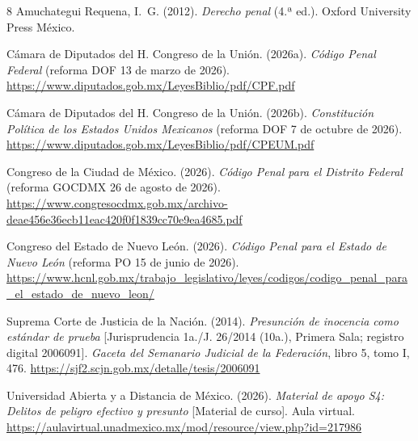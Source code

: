 \documentclass[spanish,letterpaper,oneside]{article}
\begin{document}
\begingroup\fontsize{10}{11.5}\selectfont
\setlength{\bibsep}{4pt}
\begin{thebibliography}{8}
Amuchategui Requena, I.~G. (2012). \emph{Derecho penal} (4.ª ed.). Oxford University Press México.

Cámara de Diputados del H. Congreso de la Unión. (2026a). \emph{Código Penal Federal} (reforma DOF 13 de marzo de 2026). \url{https://www.diputados.gob.mx/LeyesBiblio/pdf/CPF.pdf}

Cámara de Diputados del H. Congreso de la Unión. (2026b). \emph{Constitución Política de los Estados Unidos Mexicanos} (reforma DOF 7 de octubre de 2026). \url{https://www.diputados.gob.mx/LeyesBiblio/pdf/CPEUM.pdf}

Congreso de la Ciudad de México. (2026). \emph{Código Penal para el Distrito Federal} (reforma GOCDMX 26 de agosto de 2026). \url{https://www.congresocdmx.gob.mx/archivo-deae456e36ecb11eac420f0f1839cc70e9ea4685.pdf}

Congreso del Estado de Nuevo León. (2026). \emph{Código Penal para el Estado de Nuevo León} (reforma PO 15 de junio de 2026). \url{https://www.hcnl.gob.mx/trabajo_legislativo/leyes/codigos/codigo_penal_para_el_estado_de_nuevo_leon/}

Suprema Corte de Justicia de la Nación. (2014). \emph{Presunción de inocencia como estándar de prueba} [Jurisprudencia 1a./J. 26/2014 (10a.), Primera Sala; registro digital 2006091]. \emph{Gaceta del Semanario Judicial de la Federación}, libro 5, tomo I, 476. \url{https://sjf2.scjn.gob.mx/detalle/tesis/2006091}

Universidad Abierta y a Distancia de México. (2026). \emph{Material de apoyo S4: Delitos de peligro efectivo y presunto} [Material de curso]. Aula virtual. \url{https://aulavirtual.unadmexico.mx/mod/resource/view.php?id=217986}
\end{thebibliography}
\endgroup
\end{document}
